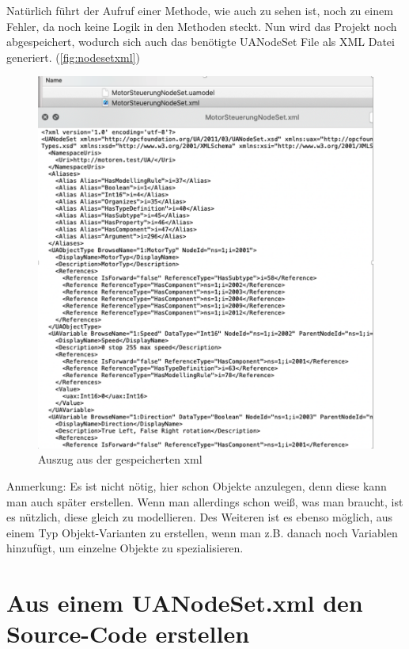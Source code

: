 Natürlich führt der Aufruf einer Methode, wie auch zu sehen ist, noch zu einem Fehler, da noch keine Logik in den Methoden steckt.
Nun wird das Projekt noch abgespeichert, wodurch sich auch das benötigte UANodeSet File als XML Datei generiert.
(\autoref{fig:nodesetxml})
\begin{figure}[H]
	\centering
	\includegraphics[width=0.8\linewidth]{abb/NodesetXML}
	\caption{Auszug aus der gespeicherten xml}
	\label{fig:nodesetxml}
\end{figure}

Anmerkung: Es ist nicht nötig, hier schon Objekte anzulegen, denn diese kann man auch später erstellen. Wenn man allerdings schon weiß, was man braucht, ist es nützlich, diese gleich zu modellieren. Des Weiteren ist es ebenso möglich, aus einem Typ Objekt-Varianten zu erstellen, wenn man z.B. danach noch Variablen hinzufügt, um einzelne Objekte zu spezialisieren.


\section{Aus einem UANodeSet.xml den Source-Code erstellen}

